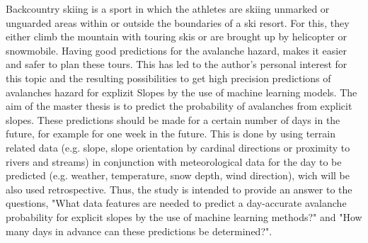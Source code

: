 \documentclass[12pt,a4paper]{article}
\begin{document}
\newline
Backcountry skiing is a sport in which the athletes are skiing unmarked or unguarded areas within or outside the boundaries of a ski resort. For this, they either climb the mountain with touring skis or are brought up by helicopter or snowmobile. Having good predictions for the avalanche hazard, makes it easier and safer to plan these tours. This has led to the author's personal interest for this topic and the resulting possibilities to get high precision predictions of avalanches hazard for explizit Slopes by the use of machine learning models.
\newline
\newline
The aim of the master thesis is to predict the probability of avalanches from explicit slopes. These predictions should be made for a certain number of days in the future, for example for one week in the future. This is done by using terrain related data (e.g. slope, slope orientation by cardinal directions or proximity to rivers and streams) in conjunction with meteorological data for the day to be predicted (e.g. weather, temperature, snow depth, wind direction), wich will be also used retrospective. Thus, the study is intended to provide an answer to the questions, "What data features are needed to predict a day-accurate avalanche probability for explicit slopes by the use of machine learning methods?" and "How many days in advance can these predictions be determined?". 
\end{document}
